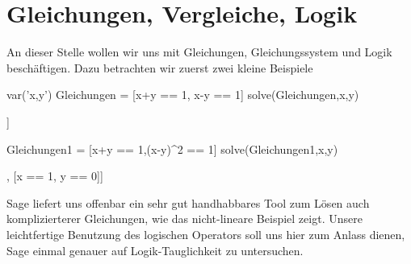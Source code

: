 \documentclass[fontsize=12pt,paper=a4,twoside,bibtotoc,idxtotoc,
liststotoc,pagesize,BCOR1.2cm,DIV15,chapterprefix,pagesize=pdftex]{scrbook}
\theoremstyle{plain}
\theoremstyle{definition}
\theoremstyle{remark}
\begin{document}
\section{Gleichungen, Vergleiche, Logik}
An dieser Stelle wollen wir uns mit Gleichungen, Gleichungssystem und Logik beschäftigen. Dazu betrachten wir zuerst zwei kleine Beispiele 
\begin{sagein}
var('x,y')
Gleichungen = [x+y == 1, x-y == 1]
solve(Gleichungen,x,y)
\end{sagein}
\begin{sageout}
[[x == 1, y == 0]]
\end{sageout}
\begin{sagein}
Gleichungen1 = [x+y == 1,(x-y)^2 == 1]
solve(Gleichungen1,x,y)
\end{sagein}
\begin{sageout}
[[x == 0, y == 1], [x == 1, y == 0]]
\end{sageout}
Sage liefert uns offenbar ein sehr gut handhabbares Tool zum Lösen auch komplizierterer Gleichungen, wie das nicht-lineare Beispiel zeigt.
Unsere leichtfertige Benutzung des logischen Operators {\color{blue} \verb == } soll uns hier zum Anlass dienen, Sage einmal genauer auf 
Logik-Tauglichkeit zu untersuchen.
\end{document}
